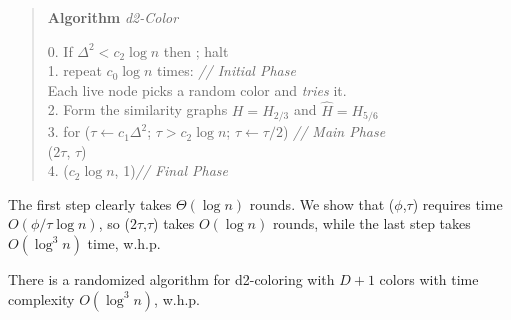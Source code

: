 \begin{quote}
   \textbf{Algorithm} \emph{d2-Color}

   0. If $\Delta^2 < c_2 \log n$ then ; halt \\
   1. repeat $c_0 \log n$ times: \hspace{5cm }\textit{// Initial Phase} \\
   \hspace*{2em} Each live node picks a random color and \emph{tries} it. \\     
   2. Form the similarity graphs $H=H_{2/3}$ and $\hat{H} = H_{5/6}$ \\
   3. for ($\tau \leftarrow c_1 \Delta^2$; $\tau > c_2 \log n$; $\tau \leftarrow \tau/2$) \hspace{2cm }\textit{// Main Phase}\\
\hspace*{2em}      ($2 \tau$, $\tau$) \\
    4. ($c_2 \log n$, 1)\hspace{5.25cm}\textit{// Final Phase}
\end{quote}

The first step clearly takes $\Theta(\log n)$ rounds.
We show that ($\phi$,$\tau$) requires time $O(\phi/\tau\log n)$, so ($2\tau$,$\tau$) takes $O(\log n)$ rounds, while the last step takes $O(\log^3 n)$ time, w.h.p.
%
\begin{corollary}
  There is a randomized {\congest} algorithm for d2-coloring with $D+1$ colors with time complexity $O(\log^3 n)$, w.h.p.
\end{corollary}

